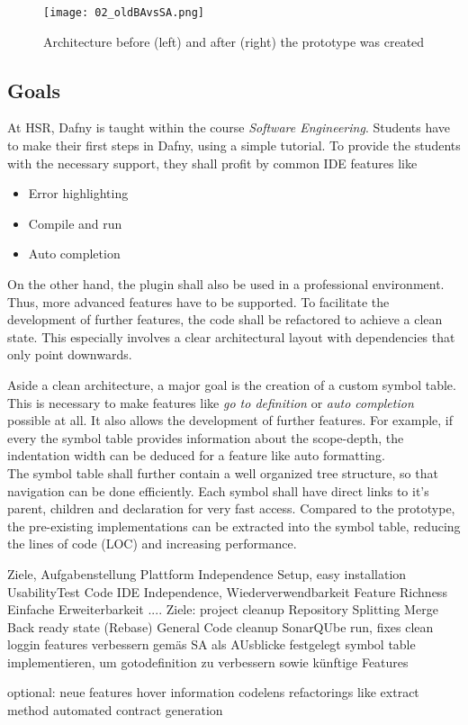 \begin{figure}[ht]
    \centering
    \texttt{[image: 02\_oldBAvsSA.png]}
    \caption{Architecture before (left) and after (right) the prototype was created}
    \label{fig:oldBAvsSA}
\end{figure}


\subsection{Goals}
At HSR, Dafny is taught within the course \textit{Software Engineering}.
Students have to make their first steps in Dafny, using a simple tutorial.
To provide the students with the necessary support, they shall profit by common IDE features like
\begin{itemize}
    \item Error highlighting
    \item Compile and run
    \item Auto completion
\end{itemize}

On the other hand, the plugin shall also be used in a professional environment.
Thus, more advanced features have to be supported.
To facilitate the development of further features, the code shall be refactored to achieve a clean state.
This especially involves a clear architectural layout with dependencies that only point downwards.

Aside a clean architecture, a major goal is the creation of a custom symbol table.
This is necessary to make features like \textit{go to definition} or \textit{auto completion} possible at all.
It also allows the development of further features.
For example, if every the symbol table provides information about the scope-depth, the indentation width can be deduced for a feature like auto formatting.\\

The symbol table shall further contain a well organized tree structure, so that navigation can be done efficiently.
Each symbol shall have direct links to it's parent, children and declaration for very fast access.
Compared to the prototype, the pre-existing implementations can be extracted into the symbol table, reducing the lines of code (LOC) and increasing performance.


Ziele, Aufgabenstellung
Plattform Independence
Setup, easy installation
UsabilityTest Code
IDE Independence, Wiederverwendbarkeit
Feature Richness
Einfache Erweiterbarkeit
....
Ziele: project cleanup
Repository Splitting
Merge Back ready state (Rebase)
General Code cleanup
SonarQUbe run, fixes
clean loggin
features verbessern gemäs SA als AUsblicke festgelegt
symbol table implementieren, um gotodefinition zu verbessern sowie künftige Features

optional: neue features
hover information
codelens
refactorings like extract method
automated contract generation
